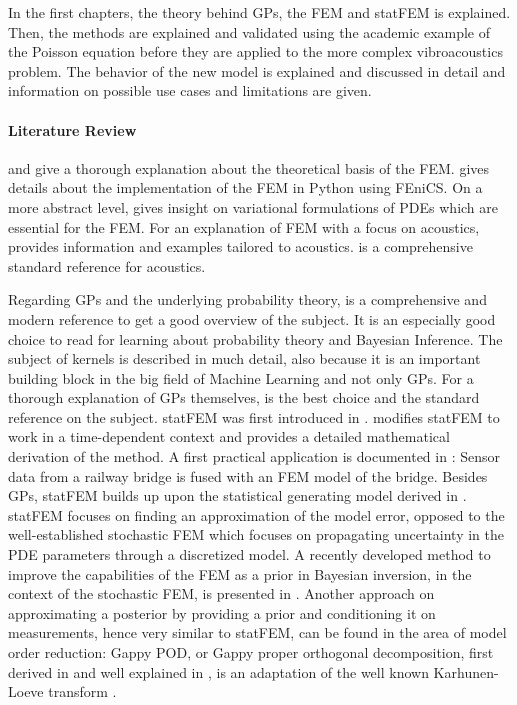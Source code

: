 \documentclass[%
  a4paper,oneside,%
  11pt,%
  smallchapters,
  style=printdev,
  extramargin,
  green,%
  rgb, <cmyk>
  ]{tubsbook}
\begin{document}
In the first chapters, the theory behind GPs, the FEM and statFEM is explained. Then, the methods are explained and validated using the academic example of the Poisson equation before they are applied to the more complex vibroacoustics problem. The behavior of the new model is explained and discussed in detail and information on possible use cases and limitations are given.

\paragraph{Literature Review}
\cite{langtangen2019} and \cite{larson2013} give a thorough explanation about the theoretical basis of the FEM. \cite{langtangen2016} gives details about the implementation of the FEM in Python using FEniCS. On a more abstract level, \cite{Lanczos1986} gives insight on variational formulations of PDEs which are essential for the FEM. For an explanation of FEM with a focus on acoustics, \cite{atalla2015} provides information and examples tailored to acoustics. \cite{moser2005} is a comprehensive standard reference for acoustics. 

Regarding GPs and the underlying probability theory, \cite{murphy2012} is a comprehensive and modern reference to get a good overview of the subject. It is an especially good choice to read for learning about probability theory and Bayesian Inference. The subject of kernels is described in much detail, also because it is an important building block in the big field of Machine Learning and not only GPs. For a thorough explanation of GPs themselves, \cite{rasmussen2006} is the best choice and the standard reference on the subject. statFEM was first introduced in \cite{girolami2021}. \cite{Duffin2020} modifies statFEM to work in a time-dependent context and provides a detailed mathematical derivation of the method. A first practical application is documented in \cite{Febrianto2021}: Sensor data from a railway bridge is fused with an FEM model of the bridge. Besides GPs, statFEM builds up upon the statistical generating model derived in \cite{kennedy2001}. statFEM focuses on finding an approximation of the model error, opposed to the well-established stochastic FEM \cite{Stefanou2009} which focuses on propagating uncertainty in the PDE parameters through a discretized model. A recently developed method to improve the capabilities of the FEM as a prior in Bayesian inversion, in the context of the stochastic FEM, is presented in \cite{Abdulle2021}. 
Another approach on approximating a posterior by providing a prior and conditioning it on measurements, hence very similar to statFEM, can be found in the area of model order reduction: Gappy POD, or Gappy proper orthogonal decomposition, first derived in \cite{Everson1995} and well explained in \cite{StevenL.Brunton2019}, is an adaptation of the well known Karhunen-Loeve transform \cite{Rao2001} \cite{Loeve1994}. 
\end{document}
